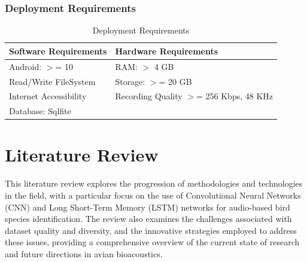 \subsection{Deployment Requirements}
\begin{table}[ht]
    \centering
    \caption{Deployment Requirements}
    \begin{tabular}{|l|l|}
        \hline
        \textbf{Software Requirements} & \textbf{Hardware Requirements}
        \\ \hline
        Android: \(>\)= 10             & RAM: \(>\) 4 GB
        \\ \hline
        Read/Write FileSystem          & Storage: \(>\)= 20 GB
        \\ \hline
        Internet Accessibility         & Recording Quality \(>\)= 256 Kbps, 48
        KHz 
        \\ \hline
        Database: Sqlfite              &                                                               \\ \hline
    \end{tabular}
\end{table}

\chapter{Literature Review}

This literature review explores the progression of methodologies and
technologies in the field,
with a particular focus on the use of Convolutional Neural Networks (CNN) and
Long Short-Term Memory (LSTM)
networks for audio-based bird species identification. The review also examines
the challenges associated
with dataset quality and diversity, and the innovative strategies employed to
address these issues,
providing a comprehensive overview of the current state of research and future
directions in avian bioacoustics.

